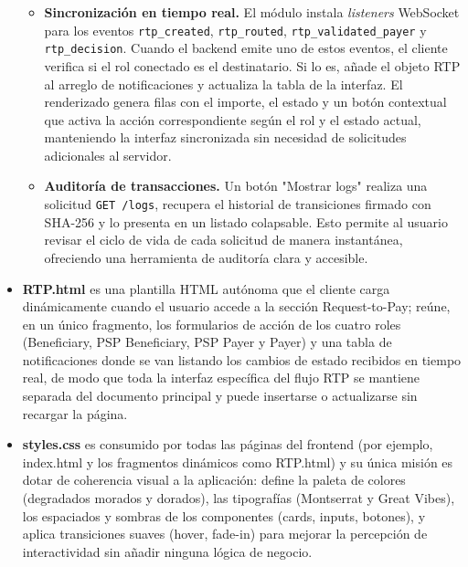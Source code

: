 \begin{itemize}
\begin{itemize}
            \item \textbf{Sincronización en tiempo real.} El módulo instala \textit{listeners} WebSocket para los eventos \texttt{rtp\_created}, \texttt{rtp\_routed}, \texttt{rtp\_validated\_payer} y \texttt{rtp\_decision}. Cuando el backend emite uno de estos eventos, el cliente verifica si el rol conectado es el destinatario. Si lo es, añade el objeto RTP al arreglo de notificaciones y actualiza la tabla de la interfaz. El renderizado genera filas con el importe, el estado y un botón contextual que activa la acción correspondiente según el rol y el estado actual, manteniendo la interfaz sincronizada sin necesidad de solicitudes adicionales al servidor.

            \item \textbf{Auditoría de transacciones.} Un botón "Mostrar logs" realiza una solicitud \texttt{GET /logs}, recupera el historial de transiciones firmado con SHA-256 y lo presenta en un listado colapsable. Esto permite al usuario revisar el ciclo de vida de cada solicitud de manera instantánea, ofreciendo una herramienta de auditoría clara y accesible.
        \end{itemize}

    \item \textbf{RTP.html} es una plantilla HTML autónoma que el cliente carga dinámicamente cuando el usuario accede a la sección Request-to-Pay; reúne, en un único fragmento, los formularios de acción de los cuatro roles (Beneficiary, PSP Beneficiary, PSP Payer y Payer) y una tabla de notificaciones donde se van listando los cambios de estado recibidos en tiempo real, de modo que toda la interfaz específica del flujo RTP se mantiene separada del documento principal y puede insertarse o actualizarse sin recargar la página.
    \item \textbf{styles.css} es consumido por todas las páginas del frontend (por ejemplo, index.html y los fragmentos dinámicos como RTP.html) y su única misión es dotar de coherencia visual a la aplicación: define la paleta de colores (degradados morados y dorados), las tipografías (Montserrat y Great Vibes), los espaciados y sombras de los componentes (cards, inputs, botones), y aplica transiciones suaves (hover, fade-in) para mejorar la percepción de interactividad sin añadir ninguna lógica de negocio. 
\end{itemize}

